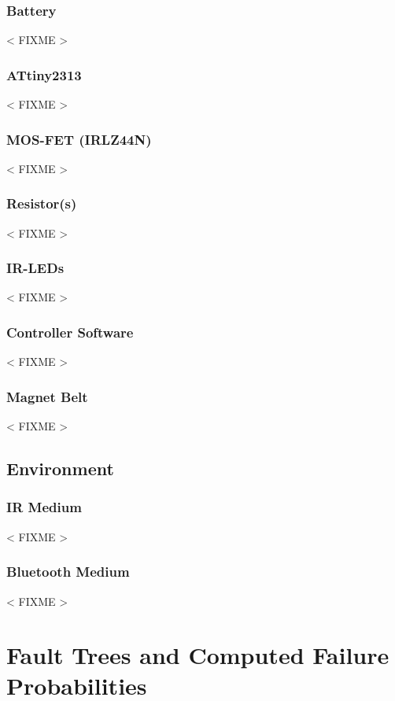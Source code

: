 \documentclass[a4paper,parskip,headheight=38pt]{scrartcl} %
\newcommand{\incomplete}[1]{\textless{} #1 \textgreater{}}
\begin{document}
\subsubsection{Battery}
\incomplete{FIXME}

\subsubsection{ATtiny2313}
\incomplete{FIXME}

\subsubsection{MOS-FET (IRLZ44N)}
\incomplete{FIXME}

\subsubsection{Resistor(s)}
\incomplete{FIXME}

\subsubsection{IR-LEDs}
\incomplete{FIXME}

\subsubsection{Controller Software}
\incomplete{FIXME}

\subsubsection{Magnet Belt}
\incomplete{FIXME}

\subsection{Environment} %

\subsubsection{IR Medium}
\incomplete{FIXME}

\subsubsection{Bluetooth Medium}

\incomplete{FIXME}


\section{Fault Trees and Computed Failure Probabilities}
\end{document}
